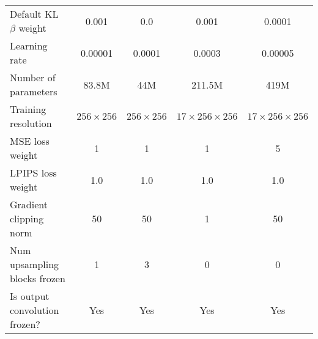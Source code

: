 \begin{table*}[h]
\begin{tabular}{lcccc}
Default KL $\beta$ weight & 0.001 & 0.0 & 0.001 & 0.0001 \\
Learning rate & 0.00001 & 0.0001 & 0.0003 & 0.00005 \\
Number of parameters & 83.8M & 44M & 211.5M & 419M \\
Training resolution & $256 \times 256$ & $256 \times 256$ & $17 \times 256 \times 256$ & $17 \times 256 \times 256$ \\
MSE loss weight & 1 & 1 & 1 & 5 \\
LPIPS loss weight & 1.0 & 1.0 & 1.0 & 1.0 \\
Gradient clipping norm & 50 & 50 & 1 & 50 \\
Num upsampling blocks frozen & 1 & 3 & 0 & 0 \\
Is output convolution frozen? & Yes & Yes & Yes & Yes \\
\bottomrule
\end{tabular}
\end{table*}
